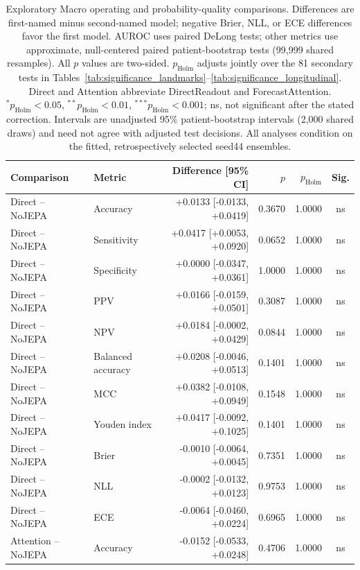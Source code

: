 \begin{table}[t]
\centering
\small
\caption{Exploratory Macro operating and probability-quality comparisons. Differences are first-named minus second-named model; negative Brier, NLL, or ECE differences favor the first model. AUROC uses paired DeLong tests; other metrics use approximate, null-centered paired patient-bootstrap tests (99,999 shared resamples). All $p$ values are two-sided. $p_{\mathrm{Holm}}$ adjusts jointly over the 81 secondary tests in Tables~\ref{tab:significance_landmarks}--\ref{tab:significance_longitudinal}. Direct and Attention abbreviate DirectReadout and ForecastAttention. $^{*}p_{\mathrm{Holm}}<0.05$, $^{**}p_{\mathrm{Holm}}<0.01$, $^{***}p_{\mathrm{Holm}}<0.001$; ns, not significant after the stated correction. Intervals are unadjusted 95\% patient-bootstrap intervals (2,000 shared draws) and need not agree with adjusted test decisions. All analyses condition on the fitted, retrospectively selected seed44 ensembles.}
\label{tab:significance_extended}
\begin{tabular}{llrrrc}
\toprule
Comparison & Metric & Difference [95\% CI] & $p$ & $p_{\mathrm{Holm}}$ & Sig. \\
\midrule
Direct -- NoJEPA & Accuracy & +0.0133 [-0.0133, +0.0419] & 0.3670 & 1.0000 & ns \\
Direct -- NoJEPA & Sensitivity & +0.0417 [+0.0053, +0.0920] & 0.0652 & 1.0000 & ns \\
Direct -- NoJEPA & Specificity & +0.0000 [-0.0347, +0.0361] & 1.0000 & 1.0000 & ns \\
Direct -- NoJEPA & PPV & +0.0166 [-0.0159, +0.0501] & 0.3087 & 1.0000 & ns \\
Direct -- NoJEPA & NPV & +0.0184 [-0.0002, +0.0429] & 0.0844 & 1.0000 & ns \\
Direct -- NoJEPA & Balanced accuracy & +0.0208 [-0.0046, +0.0513] & 0.1401 & 1.0000 & ns \\
Direct -- NoJEPA & MCC & +0.0382 [-0.0108, +0.0949] & 0.1548 & 1.0000 & ns \\
Direct -- NoJEPA & Youden index & +0.0417 [-0.0092, +0.1025] & 0.1401 & 1.0000 & ns \\
Direct -- NoJEPA & Brier & -0.0010 [-0.0064, +0.0045] & 0.7351 & 1.0000 & ns \\
Direct -- NoJEPA & NLL & -0.0002 [-0.0132, +0.0123] & 0.9753 & 1.0000 & ns \\
Direct -- NoJEPA & ECE & -0.0064 [-0.0460, +0.0224] & 0.6965 & 1.0000 & ns \\
Attention -- NoJEPA & Accuracy & -0.0152 [-0.0533, +0.0248] & 0.4706 & 1.0000 & ns \\

\end{tabular}
\end{table}
